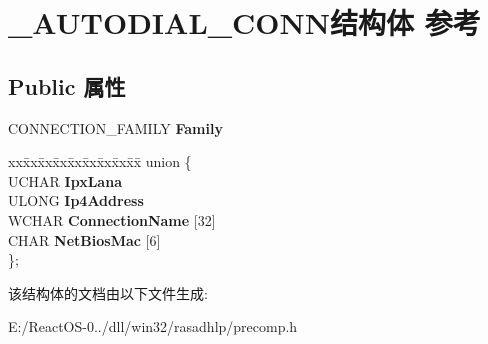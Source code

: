 \hypertarget{struct___a_u_t_o_d_i_a_l___c_o_n_n}{}\section{\+\_\+\+A\+U\+T\+O\+D\+I\+A\+L\+\_\+\+C\+O\+N\+N结构体 参考}
\label{struct___a_u_t_o_d_i_a_l___c_o_n_n}
\subsection*{Public 属性}
\begin{DoxyCompactItemize}
\item 
\mbox{\label{struct___a_u_t_o_d_i_a_l___c_o_n_n_a917ca626015ba6e769e639960c90c8d9}} 
C\+O\+N\+N\+E\+C\+T\+I\+O\+N\+\_\+\+F\+A\+M\+I\+LY {\bfseries Family}
\item 
\mbox{\label{struct___a_u_t_o_d_i_a_l___c_o_n_n_aa70999aa9fb02d9320a60340f0bc82fc}} 
\begin{tabbing}
xx\=xx\=xx\=xx\=xx\=xx\=xx\=xx\=xx\=\kill
union \{\\
\>UCHAR {\bfseries IpxLana}\\
\>ULONG {\bfseries Ip4Address}\\
\>WCHAR {\bfseries ConnectionName} \mbox{[}32\mbox{]}\\
\>CHAR {\bfseries NetBiosMac} \mbox{[}6\mbox{]}\\
\}; \\

\end{tabbing}\end{DoxyCompactItemize}


该结构体的文档由以下文件生成\+:\begin{DoxyCompactItemize}
\item 
E\+:/\+React\+O\+S-\/0../dll/win32/rasadhlp/precomp.\+h\end{DoxyCompactItemize}
